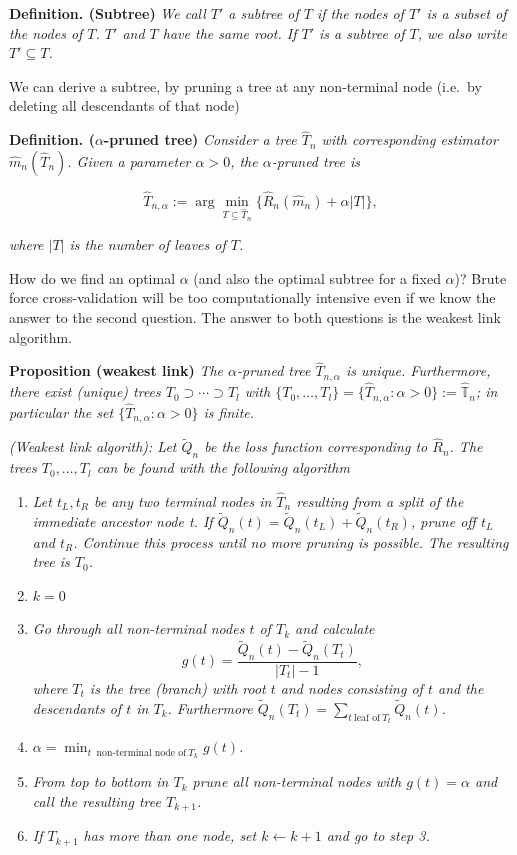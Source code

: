 \documentclass[a4paper,10pt,openany]{book}
\providecommand{\tightlist}{%
 \setlength{\itemsep}{0pt}\setlength{\parskip}{0pt}}
\begin{document}
\textbf{Definition. (Subtree)} \emph{We call \(T'\) a subtree of \(T\) if the nodes of \(T'\) is a subset of the nodes of \(T\). \(T'\) and \(T\) have the same root. If \(T'\) is a subtree of \(T\), we also write \(T'\subseteq T\).}

We can derive a subtree, by pruning a tree at any non-terminal node (i.e.~by deleting all descendants of that node)

\textbf{Definition. (\(\alpha\)-pruned tree)} \emph{Consider a tree \(\hat T_n\) with corresponding estimator \(\hat m_n(\hat T_n)\). Given a parameter \(\alpha>0\), the \(\alpha\)-pruned tree is}

\[
\hat T_{n,\alpha} := \arg \min_{T\subseteq \hat T_n}\{\hat R_n(\hat m_n) + \alpha |T|\},
\]

\emph{where \(|T|\) is the number of leaves of \(T\).}

How do we find an optimal \(\alpha\) (and also the optimal subtree for a fixed \(\alpha\))? Brute force cross-validation will be too computationally intensive even if we know the answer to the second question. The answer to both questions is the weakest link algorithm.

\textbf{Proposition (weakest link)} \emph{The \(\alpha\)-pruned tree \(\hat T_{n,\alpha}\) is unique. Furthermore, there exist (unique) trees \(T_0\supset \cdots\supset T_l\) with \(\{T_0,\dots, T_l\}=\{\hat T_{n,\alpha} : \alpha>0\}:=\hat{ \mathbb T}_n\); in particular the set \(\{\hat T_{n,\alpha} : \alpha>0\}\) is finite.}

\emph{(Weakest link algorith): Let \(\widetilde Q_n\) be the loss function corresponding to \(\hat R_n\). The trees \(T_0,\dots, T_l\) can be found with the following algorithm}

\begin{enumerate}
\def\labelenumi{\arabic{enumi})}
\tightlist
\item
  \emph{Let \(t_L,t_R\) be any two terminal nodes in \(\hat T_n\) resulting from a split of the immediate ancestor node t. If \(\widetilde Q_n(t) = \widetilde Q_n(t_L)+\widetilde Q_n(t_R)\), prune off \(t_L\) and \(t_R\). Continue this process until no more pruning is possible. The resulting tree is \(T_0\).}
\item
  \(k=0\)
\item
  \emph{Go through all non-terminal nodes \(t\) of \(T_k\) and calculate }
  \[g(t)=\frac{\widetilde Q_n(t)-\widetilde Q_n(T_t)}{|T_t|-1},\]
  \emph{where \(T_t\) is the tree (branch) with root \(t\) and nodes consisting of \(t\) and the descendants of \(t\) in \(T_k\). Furthermore \(\widetilde Q_n(T_t)=\sum_{t \ \text{leaf of}\  T_t} \widetilde Q_n(t)\).}
\item
  \(\alpha= \min_{t \ \text{ non-terminal node of} \ T_k}g(t)\).
\item
  \emph{From top to bottom in \(T_k\) prune all non-terminal nodes with \(g(t)=\alpha\) and call the resulting tree \(T_{k+1}\).}
\item
  \emph{If \(T_{k+1}\) has more than one node, set \(k \leftarrow k+1\) and go to step 3.}
\end{enumerate}
\end{document}
